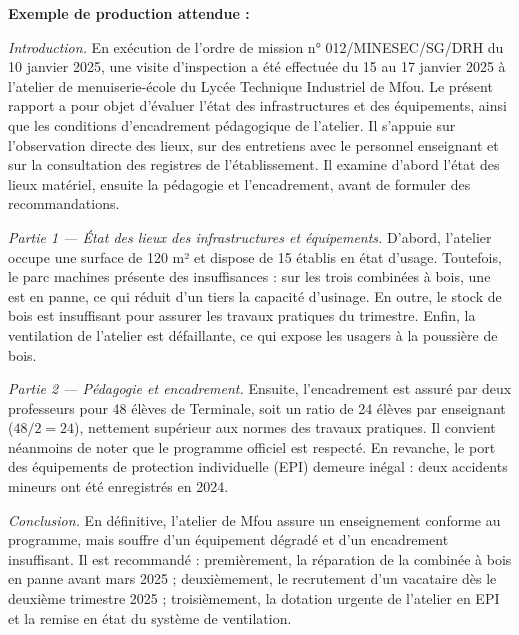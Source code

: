 \documentclass[11pt]{article}
\begin{document}
\begin{corrige}
\textbf{Exemple de production attendue :}

\emph{Introduction.} En exécution de l'ordre de mission n° 012/MINESEC/SG/DRH du 10 janvier 2025, une visite d'inspection a été effectuée du 15 au 17 janvier 2025 à l'atelier de menuiserie-école du Lycée Technique Industriel de Mfou. Le présent rapport a pour objet d'évaluer l'état des infrastructures et des équipements, ainsi que les conditions d'encadrement pédagogique de l'atelier. Il s'appuie sur l'observation directe des lieux, sur des entretiens avec le personnel enseignant et sur la consultation des registres de l'établissement. Il examine d'abord l'état des lieux matériel, ensuite la pédagogie et l'encadrement, avant de formuler des recommandations.

\emph{Partie 1 — État des lieux des infrastructures et équipements.} D'abord, l'atelier occupe une surface de 120 m² et dispose de 15 établis en état d'usage. Toutefois, le parc machines présente des insuffisances : sur les trois combinées à bois, une est en panne, ce qui réduit d'un tiers la capacité d'usinage. En outre, le stock de bois est insuffisant pour assurer les travaux pratiques du trimestre. Enfin, la ventilation de l'atelier est défaillante, ce qui expose les usagers à la poussière de bois.

\emph{Partie 2 — Pédagogie et encadrement.} Ensuite, l'encadrement est assuré par deux professeurs pour 48 élèves de Terminale, soit un ratio de 24 élèves par enseignant ($48 / 2 = 24$), nettement supérieur aux normes des travaux pratiques. Il convient néanmoins de noter que le programme officiel est respecté. En revanche, le port des équipements de protection individuelle (EPI) demeure inégal : deux accidents mineurs ont été enregistrés en 2024.

\emph{Conclusion.} En définitive, l'atelier de Mfou assure un enseignement conforme au programme, mais souffre d'un équipement dégradé et d'un encadrement insuffisant. Il est recommandé : premièrement, la réparation de la combinée à bois en panne avant mars 2025 ; deuxièmement, le recrutement d'un vacataire dès le deuxième trimestre 2025 ; troisièmement, la dotation urgente de l'atelier en EPI et la remise en état du système de ventilation.


\end{corrige}
\end{document}

